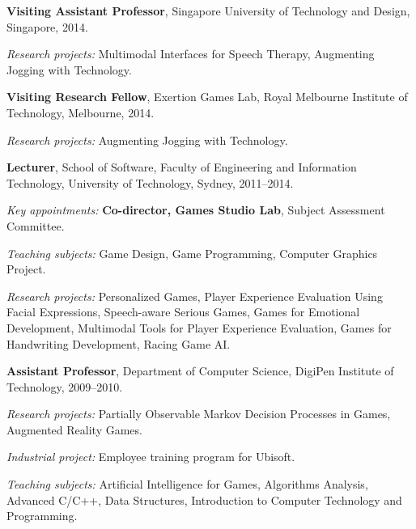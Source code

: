 \documentclass[10pt,a4paper]{article}
\renewenvironment{itemize}{
    \begin{list}{}{
            \setlength{\leftmargin}{1.5em}
            \setlength{\itemsep}{0.25em}
            \setlength{\parskip}{0pt}
            \setlength{\parsep}{0.25em}
        }
        }{
    \end{list}
}
\begin{document}
\begin{itemize}
    \item \textbf{Visiting Assistant Professor}, Singapore University of Technology and Design, Singapore,
        2014.
        \begin{itemize}
            \item \textit{Research projects:} Multimodal Interfaces for Speech Therapy, Augmenting Jogging with Technology.
        \end{itemize}

    \item \textbf{Visiting Research Fellow}, Exertion Games Lab, Royal Melbourne Institute of Technology, Melbourne,
        2014.
        \begin{itemize}
            \item \textit{Research projects:} Augmenting Jogging with Technology.
        \end{itemize}

    \item \textbf{Lecturer}, School of Software, Faculty of Engineering and Information Technology, University of Technology, Sydney,
        2011--2014.
        \begin{itemize}
            \item \textit{Key appointments:} \textbf{Co-director, Games Studio Lab}, Subject Assessment Committee.
            \item \textit{Teaching subjects:} Game Design, Game Programming, Computer Graphics Project.
            \item \textit{Research projects:} Personalized Games, Player Experience Evaluation Using Facial Expressions, Speech-aware Serious Games, Games for Emotional Development, Multimodal Tools for Player Experience Evaluation, Games for Handwriting Development, Racing Game AI.
        \end{itemize}

    \item \textbf{Assistant Professor}, Department of Computer Science, DigiPen Institute of Technology,
        2009--2010.
        \begin{itemize}
            \item \textit{Research projects:} Partially Observable Markov Decision Processes in Games, Augmented Reality Games.
            \item \textit{Industrial project:} Employee training program for Ubisoft.
            \item \textit{Teaching subjects:} Artificial Intelligence for Games, Algorithms Analysis, Advanced C/C++, Data Structures, Introduction to Computer Technology and Programming.
        \end{itemize}


\end{itemize}
\end{document}
